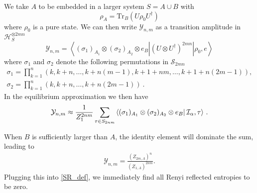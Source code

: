 \documentclass[a4paper,11pt]{article}
\newcommand\vev[1]{{\ensuremath{\left\langle{#1}\right\rangle}}}
\newcommand{\be}{\begin{equation}}
\newcommand{\ee}{\end{equation}}
\newcommand{\bega}{\begin{gather}}
\newcommand\sig{\sigma}
\newcommand\da{{\dagger}}
\newcommand\sH{{\ensuremath{{\mathcal H}}}}
\newcommand\sS{{\mathcal S}}
\newcommand\sY{{\mathcal Y}}
\newcommand{\Tr}{\text{Tr}}
\begin{document}
We take $A$ to be embedded in a larger system $S = A \cup B$ with 
\be 
\rho_A = \Tr_B (U \rho_0 U^\da)
\ee
where $\rho_0$ is a pure state. We can then write $\sY_{n,m}$ as a transition amplitude in $\sH_S^{\otimes 2 mn}$ 
\be 
\sY_{n,m} = \vev{(\sig_1)_{A_1}\otimes (\sig_2)_{A_2} \otimes e_B| (U \otimes U^\da)^{2mn} |\rho_0, e} 
\ee
where $\sig_1$ and $\sig_2$ denote the following permutations in $\sS_{2mn}$
\bega
\sig_1 = \prod_{k = 1}^n (k, k+n, \dots, k+n(m-1),k+1+nm,\dots,k+1+n(2m-1)) , \\
\sig_2 = \prod_{k = 1}^n (k, k+n, \dots, k+n(2m-1)) \ .
\end{gather} 
In the equilibrium approximation we then have 
\be 
\sY_{n,m} \approx \frac{1}{Z_1^{2nm}} \sum_{ \tau \in S_{2nm}}\bra{(\sigma_{1})_{A_1} \otimes (\sigma_2)_{A_2} \otimes e_{B}}\mathcal{I}_{\alpha},\tau\rangle \ .
 \label{reflected_equil}
\ee


When $B$ is sufficiently larger than $A$, the identity element will dominate the sum, leading to
\begin{align}
 \sY_{n, m} = \frac{(Z_{2m,A})^n}{(Z_{1,A})^{2nm}}.
\end{align}
Plugging this into \eqref{SR_def}, we immediately find all Renyi reflected entropies to be zero.
\end{document}

